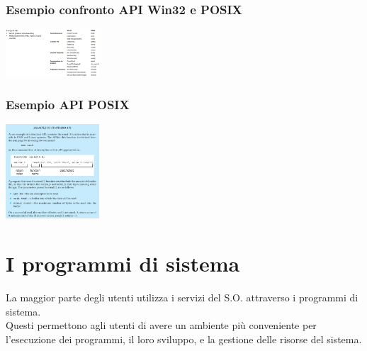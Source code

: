 \subsubsection{Esempio confronto API Win32 e POSIX}
\begin{center}
    \includegraphics[width=35mm]{images/SO/SO_chiamatedisistema_API_es1.jpg}
\end{center}

\subsubsection{Esempio API POSIX}
\begin{center}
    \includegraphics[width=35mm]{images/SO/SO_chiamatedisistema_API_es2.jpg}
\end{center}

\section{I programmi di sistema}
La maggior parte degli utenti utilizza i servizi del S.O. attraverso i programmi di sistema.\\
Questi permettono agli utenti di avere un ambiente più conveniente per l'esecuzione dei programmi, il loro sviluppo, e la gestione delle risorse del sistema.
